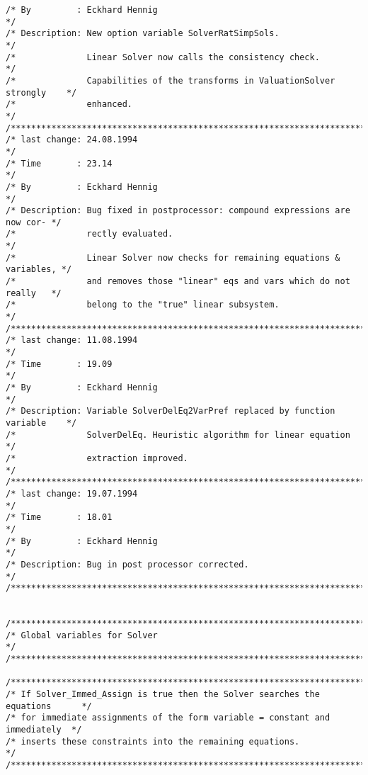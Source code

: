 \begin{verbatim}
/* By         : Eckhard Hennig                                                */
/* Description: New option variable SolverRatSimpSols.                        */
/*              Linear Solver now calls the consistency check.                */
/*              Capabilities of the transforms in ValuationSolver strongly    */
/*              enhanced.                                                     */
/******************************************************************************/
/* last change: 24.08.1994                                                    */
/* Time       : 23.14                                                         */
/* By         : Eckhard Hennig                                                */
/* Description: Bug fixed in postprocessor: compound expressions are now cor- */
/*              rectly evaluated.                                             */
/*              Linear Solver now checks for remaining equations & variables, */
/*              and removes those "linear" eqs and vars which do not really   */
/*              belong to the "true" linear subsystem.                        */
/******************************************************************************/
/* last change: 11.08.1994                                                    */
/* Time       : 19.09                                                         */
/* By         : Eckhard Hennig                                                */
/* Description: Variable SolverDelEq2VarPref replaced by function variable    */
/*              SolverDelEq. Heuristic algorithm for linear equation          */
/*              extraction improved.                                          */
/******************************************************************************/
/* last change: 19.07.1994                                                    */
/* Time       : 18.01                                                         */
/* By         : Eckhard Hennig                                                */
/* Description: Bug in post processor corrected.                              */
/******************************************************************************/


/******************************************************************************/
/* Global variables for Solver                                                */
/******************************************************************************/

/******************************************************************************/
/* If Solver_Immed_Assign is true then the Solver searches the equations      */
/* for immediate assignments of the form variable = constant and immediately  */
/* inserts these constraints into the remaining equations.                    */
/******************************************************************************/


\end{verbatim}
